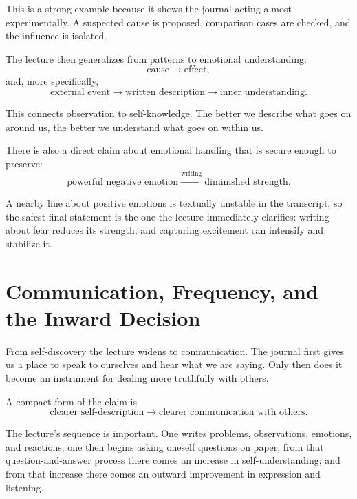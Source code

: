 This is a strong example because it shows the journal acting almost experimentally. A suspected cause is proposed, comparison cases are checked, and the influence is isolated.

The lecture then generalizes from patterns to emotional understanding:
\begin{equation}
\text{cause}\rightarrow \text{effect},
\end{equation}
and, more specifically,
\begin{equation}
\text{external event}\rightarrow \text{written description}\rightarrow \text{inner understanding}.
\end{equation}

This connects observation to self-knowledge. The better we describe what goes on around us, the better we understand what goes on within us.

There is also a direct claim about emotional handling that is secure enough to preserve:
\begin{equation}
\text{powerful negative emotion}\xrightarrow{\text{writing}}\text{diminished strength}.
\end{equation}

A nearby line about positive emotions is textually unstable in the transcript, so the safest final statement is the one the lecture immediately clarifies: writing about fear reduces its strength, and capturing excitement can intensify and stabilize it.

\section{Communication, Frequency, and the Inward Decision}

From self-discovery the lecture widens to communication. The journal first gives us a place to speak to ourselves and hear what we are saying. Only then does it become an instrument for dealing more truthfully with others.

A compact form of the claim is
\begin{equation}
\text{clearer self-description}\rightarrow \text{clearer communication with others}.
\end{equation}

The lecture's sequence is important. One writes problems, observations, emotions, and reactions; one then begins asking oneself questions on paper; from that question-and-answer process there comes an increase in self-understanding; and from that increase there comes an outward improvement in expression and listening.


